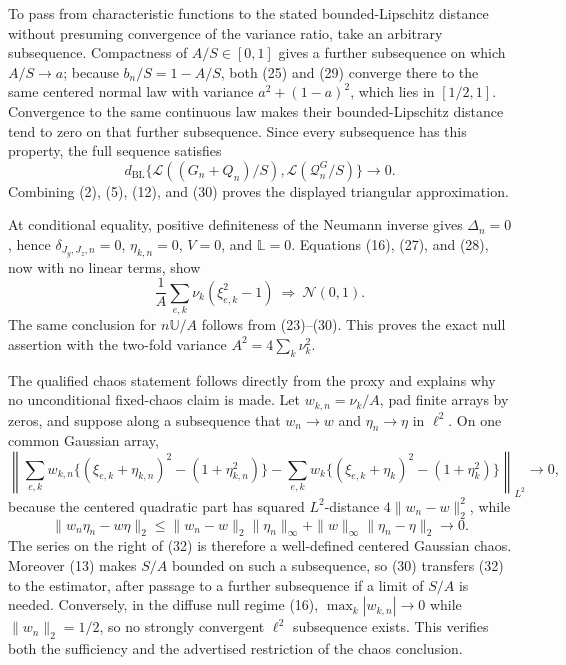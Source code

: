 To pass from characteristic functions to the stated bounded-Lipschitz distance without presuming convergence of the variance ratio, take an arbitrary subsequence.  Compactness of \(A/S\in[0,1]\) gives a further subsequence on which \(A/S\to a\); because \(b_n/S=1-A/S\), both (25) and (29) converge there to the same centered normal law with variance \(a^2+(1-a)^2\), which lies in \([1/2,1]\).  Convergence to the same continuous law makes their bounded-Lipschitz distance tend to zero on that further subsequence.  Since every subsequence has this property, the full sequence satisfies
\[
d_{\mathrm{BL}}\{\mathcal L((G_n+Q_n)/S),\mathcal L(\mathcal Q_n^G/S)\}\longrightarrow0.
\tag{30}
\]
Combining (2), (5), (12), and (30) proves the displayed triangular approximation.

At conditional equality, positive definiteness of the Neumann inverse gives \(\Delta_n=0\), hence \(\delta_{J_y,J_z,n}=0\), \(\eta_{k,n}=0\), \(V=0\), and \(\mathbb L=0\).  Equations (16), (27), and (28), now with no linear terms, show
\[
\frac1A\sum_{e,k}\nu_k(\xi_{e,k}^2-1)\ \Rightarrow\ \mathcal N(0,1).
\tag{31}
\]
The same conclusion for \(n\mathbb U/A\) follows from (23)--(30).  This proves the exact null assertion with the two-fold variance \(A^2=4\sum_k\nu_k^2\).

The qualified chaos statement follows directly from the proxy and explains why no unconditional fixed-chaos claim is made.  Let \(w_{k,n}=\nu_k/A\), pad finite arrays by zeros, and suppose along a subsequence that \(w_n\to w\) and \(\eta_n\to\eta\) in \(\ell^2\).  On one common Gaussian array,
\[
\left\|\sum_{e,k}w_{k,n}\{(\xi_{e,k}+\eta_{k,n})^2-(1+\eta_{k,n}^2)\}
-\sum_{e,k}w_k\{(\xi_{e,k}+\eta_k)^2-(1+\eta_k^2)\}\right\|_{L^2}\longrightarrow0,
\tag{32}
\]
because the centered quadratic part has squared \(L^2\)-distance \(4\|w_n-w\|_2^2\), while
\[
\|w_n\eta_n-w\eta\|_2
\le\|w_n-w\|_2\|\eta_n\|_\infty+\|w\|_\infty\|\eta_n-\eta\|_2\longrightarrow0.
\tag{33}
\]
The series on the right of (32) is therefore a well-defined centered Gaussian chaos.  Moreover (13) makes \(S/A\) bounded on such a subsequence, so (30) transfers (32) to the estimator, after passage to a further subsequence if a limit of \(S/A\) is needed.  Conversely, in the diffuse null regime (16), \(\max_k|w_{k,n}|\to0\) while \(\|w_n\|_2=1/2\), so no strongly convergent \(\ell^2\) subsequence exists.  This verifies both the sufficiency and the advertised restriction of the chaos conclusion.

